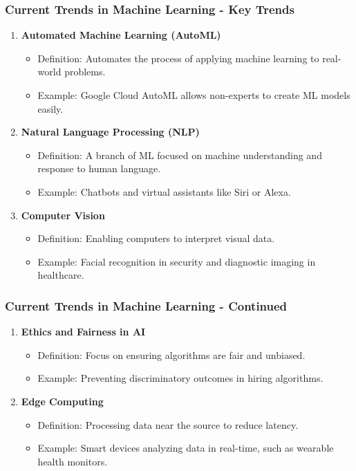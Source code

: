 \documentclass[aspectratio=169]{beamer}
\begin{document}
\begin{frame}[fragile]
    \frametitle{Current Trends in Machine Learning - Key Trends}
    \begin{enumerate}
        \item \textbf{Automated Machine Learning (AutoML)}
            \begin{itemize}
                \item Definition: Automates the process of applying machine learning to real-world problems.
                \item Example: Google Cloud AutoML allows non-experts to create ML models easily.
            \end{itemize}
        \item \textbf{Natural Language Processing (NLP)}
            \begin{itemize}
                \item Definition: A branch of ML focused on machine understanding and response to human language.
                \item Example: Chatbots and virtual assistants like Siri or Alexa.
            \end{itemize}
        \item \textbf{Computer Vision}
            \begin{itemize}
                \item Definition: Enabling computers to interpret visual data.
                \item Example: Facial recognition in security and diagnostic imaging in healthcare.
            \end{itemize}
    \end{enumerate}
\end{frame}

\begin{frame}[fragile]
    \frametitle{Current Trends in Machine Learning - Continued}
    \begin{enumerate}[resume]
        \item \textbf{Ethics and Fairness in AI}
            \begin{itemize}
                \item Definition: Focus on ensuring algorithms are fair and unbiased.
                \item Example: Preventing discriminatory outcomes in hiring algorithms.
            \end{itemize}
        \item \textbf{Edge Computing}
            \begin{itemize}
                \item Definition: Processing data near the source to reduce latency.
                \item Example: Smart devices analyzing data in real-time, such as wearable health monitors.
            \end{itemize}
    \end{enumerate}
\end{frame}
\end{document}
